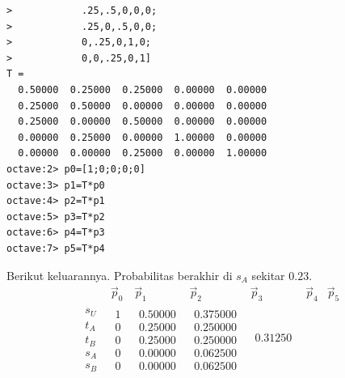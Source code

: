 \begin{exercises}
\begin{answer}
\begin{exparts}
\begin{lstlisting}
>            .25,.5,0,0,0;
>            .25,0,.5,0,0;
>            0,.25,0,1,0;
>            0,0,.25,0,1]
T =
  0.50000  0.25000  0.25000  0.00000  0.00000
  0.25000  0.50000  0.00000  0.00000  0.00000
  0.25000  0.00000  0.50000  0.00000  0.00000
  0.00000  0.25000  0.00000  1.00000  0.00000
  0.00000  0.00000  0.25000  0.00000  1.00000
octave:2> p0=[1;0;0;0;0]
octave:3> p1=T*p0
octave:4> p2=T*p1
octave:5> p3=T*p2
octave:6> p4=T*p3
octave:7> p5=T*p4
\end{lstlisting}
        Berikut keluarannya.
        Probabilitas berakhir di $s_A$ sekitar $0.23$.
        \begin{equation*}
          \begin{array}{cc|ccccc}
            &\vec{p}_0 &\vec{p}_1 &\vec{p}_2 &\vec{p}_3 
                &\vec{p}_4 &\vec{p}_5 \\
            \hline
            \begin{array}{c}
              s_U \\
              t_A \\
              t_B \\
              s_A \\
              s_B
            \end{array}
            &\begin{array}{c}
               1 \\
               0 \\
               0 \\
               0 \\
               0
            \end{array}
            &\begin{array}{c}
              0.50000 \\
              0.25000 \\
              0.25000 \\
              0.00000 \\
              0.00000
            \end{array}
            &\begin{array}{c}
              0.375000 \\
              0.250000 \\
              0.250000 \\
              0.062500 \\
              0.062500
            \end{array}
            &\begin{array}{c}
              0.31250 \\

\end{array}
\end{array}
\end{equation*}
\end{exparts}
\end{answer}
\end{exercises}
